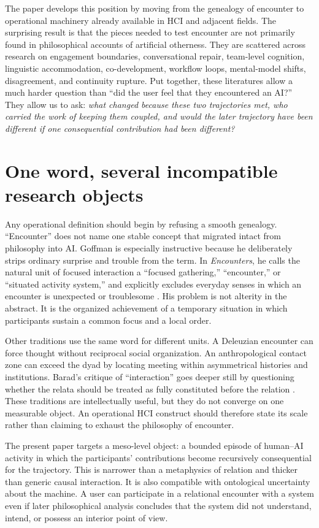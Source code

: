 \documentclass[11pt]{article}
\begin{document}
The paper develops this position by moving from the genealogy of encounter to operational machinery already available in HCI and adjacent fields. The surprising result is that the pieces needed to test encounter are not primarily found in philosophical accounts of artificial otherness. They are scattered across research on engagement boundaries, conversational repair, team-level cognition, linguistic accommodation, co-development, workflow loops, mental-model shifts, disagreement, and continuity rupture. Put together, these literatures allow a much harder question than ``did the user feel that they encountered an AI?'' They allow us to ask: \emph{what changed because these two trajectories met, who carried the work of keeping them coupled, and would the later trajectory have been different if one consequential contribution had been different?}

\section{One word, several incompatible research objects}

Any operational definition should begin by refusing a smooth genealogy. ``Encounter'' does not name one stable concept that migrated intact from philosophy into AI. Goffman is especially instructive because he deliberately strips ordinary surprise and trouble from the term. In \emph{Encounters}, he calls the natural unit of focused interaction a ``focused gathering,'' ``encounter,'' or ``situated activity system,'' and explicitly excludes everyday senses in which an encounter is unexpected or troublesome \citep{Goffman1961Encounters}. His problem is not alterity in the abstract. It is the organized achievement of a temporary situation in which participants sustain a common focus and a local order.

Other traditions use the same word for different units. A Deleuzian encounter can force thought without reciprocal social organization. An anthropological contact zone can exceed the dyad by locating meeting within asymmetrical histories and institutions. Barad's critique of ``interaction'' goes deeper still by questioning whether the relata should be treated as fully constituted before the relation \citep{Barad2003Posthumanist}. These traditions are intellectually useful, but they do not converge on one measurable object. An operational HCI construct should therefore state its scale rather than claiming to exhaust the philosophy of encounter.

The present paper targets a meso-level object: a bounded episode of human--AI activity in which the participants' contributions become recursively consequential for the trajectory. This is narrower than a metaphysics of relation and thicker than generic causal interaction. It is also compatible with ontological uncertainty about the machine. A user can participate in a relational encounter with a system even if later philosophical analysis concludes that the system did not understand, intend, or possess an interior point of view.
\end{document}
